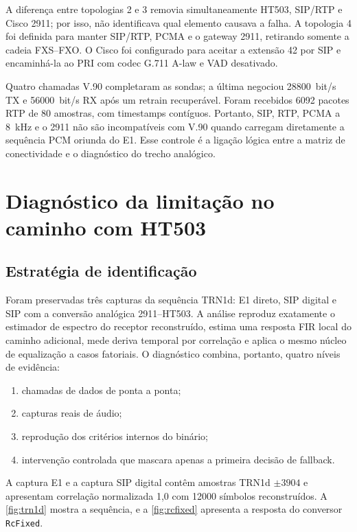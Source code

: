 \documentclass[12pt,a4paper]{article}
\begin{document}
A diferença entre topologias 2 e 3 removia simultaneamente HT503, SIP/RTP e Cisco
2911; por isso, não identificava qual elemento causava a falha. A topologia 4 foi
definida para manter SIP/RTP, PCMA e o gateway 2911, retirando somente a cadeia
FXS--FXO. O Cisco foi configurado para aceitar a extensão 42 por SIP e encaminhá-la
ao PRI com codec G.711 A-law e VAD desativado.

Quatro chamadas V.90 completaram as sondas; a última negociou
\SI{28800}{bit/s} TX e \SI{56000}{bit/s} RX após um retrain recuperável.
Foram recebidos 6092 pacotes RTP de 80 amostras, com timestamps contíguos. Portanto,
SIP, RTP, PCMA a \SI{8}{kHz} e o 2911 não são incompatíveis com V.90 quando carregam
diretamente a sequência PCM oriunda do E1. Esse controle é a ligação lógica entre a
matriz de conectividade e o diagnóstico do trecho analógico.

\section{Diagnóstico da limitação no caminho com HT503}
\label{sec:ht503}

\subsection{Estratégia de identificação}

Foram preservadas três capturas da sequência TRN1d: E1 direto, SIP digital e SIP
com a conversão analógica 2911--HT503. A análise reproduz exatamente o estimador de
espectro do receptor reconstruído, estima uma resposta FIR local do caminho adicional,
mede deriva temporal por correlação e aplica o mesmo núcleo de equalização a casos
fatoriais. O diagnóstico combina, portanto, quatro níveis de
evidência:

\begin{enumerate}
  \item chamadas de dados de ponta a ponta;
  \item capturas reais de áudio;
  \item reprodução dos critérios internos do binário;
  \item intervenção controlada que mascara apenas a primeira decisão de fallback.
\end{enumerate}

A captura E1 e a captura SIP digital contêm amostras TRN1d $\pm3904$ e apresentam
correlação normalizada 1,0 com 12000 símbolos reconstruídos. A
\cref{fig:trn1d} mostra a sequência, e a \cref{fig:rcfixed} apresenta a resposta
do conversor \texttt{RcFixed}.
\end{document}
